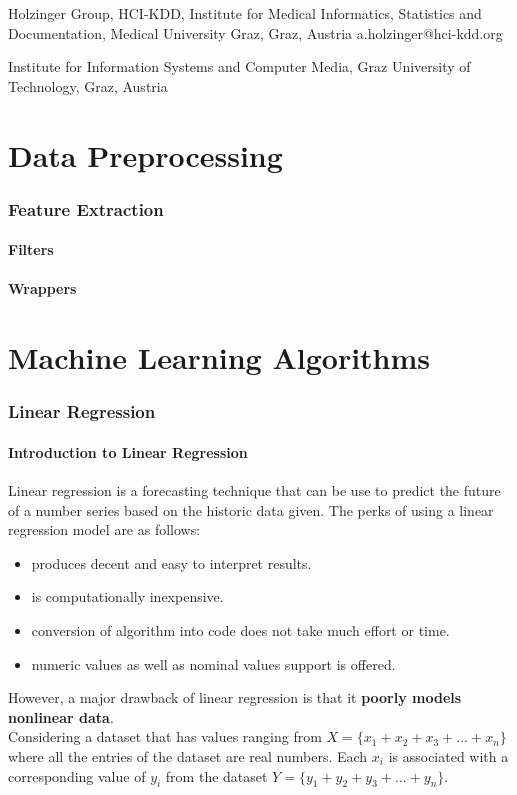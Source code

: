 \documentclass[12pt]{article}
\begin{document}
Holzinger Group, HCI-KDD, Institute for Medical Informatics,
Statistics and Documentation, Medical University Graz, Graz, Austria
a.holzinger@hci-kdd.org

Institute for Information Systems and Computer Media,
Graz University of Technology, Graz, Austria
\fi



\newpage
\part{Data Preprocessing}
\section{Feature Extraction}
\subsection{Filters}
\subsection{Wrappers}
\newpage
\part{Machine Learning Algorithms}
\newpage
\section{Linear Regression}
\subsection{Introduction to Linear Regression}
Linear regression is a forecasting technique that can be use to predict the future of a number series based on the historic data given. The perks of using a linear regression model are as follows:

\begin{itemize}
  \item produces decent and  easy to interpret results.
  \item is computationally inexpensive.
  \item conversion of algorithm into code does not take much effort or time.
  \item numeric values as well as nominal values support is offered.
\end{itemize}

However, a major drawback of linear regression is that it \textbf{poorly models nonlinear data}.
\\
Considering a dataset that has values ranging from 
$X = \lbrace x_{1}+x_{2}+x_{3}+...+x_{n} \rbrace$ where
all the entries of the dataset are real numbers. Each $x_{i}$ is associated with a corresponding value of $y_{i}$ from the dataset $Y = \lbrace y_{1}+y_{2}+y_{3}+...+y_{n} \rbrace$.
\end{document}
